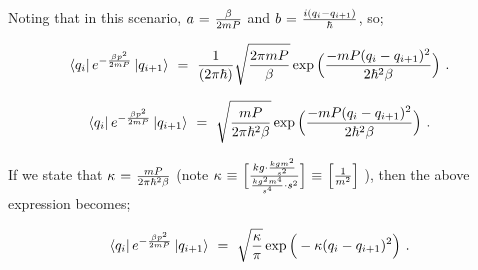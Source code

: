 \documentclass{article}
\begin{document}
Noting that in this scenario, \begin{math} a \hspace{0.025cm} = \hspace{0.025cm} \frac{\beta}{2 m P} \end{math} and \begin{math} b \hspace{0.025cm} = \hspace{0.025cm} \frac{i (q_i - q_{i + 1})}{\hbar} \end{math}, so;

\begin{equation} \label{eq:1}
\bra{q_i} e^{ - \frac{ \beta p^2}{2 m P}} \ket{q_{i+1}} \hspace{0.125cm} = \hspace{0.125cm} \frac{1}{(2 \pi \hbar)} \sqrt{\frac{2 \pi m P}{\beta}} \exp{\Big( \frac{ - m P (q_i - q_{i+1})^2}{2 \hbar^2 \beta}\Big)}  \hspace{0.125cm} .
\end{equation}

\begin{equation} \label{eq:1}
\bra{q_i} e^{ - \frac{ \beta p^2}{2 m P}} \ket{q_{i+1}} \hspace{0.125cm} = \hspace{0.125cm} \sqrt{\frac{m P}{2 \pi \hbar^2 \beta}} \exp{\Big( \frac{ - m P (q_i - q_{i+1})^2}{2 \hbar^2 \beta}\Big)} \hspace{0.125cm} .
\end{equation}

If we state that \begin{math} \kappa \hspace{0.025cm} = \hspace{0.025cm} \frac{m P}{2 \pi \hbar^2 \beta} \end{math} (note \begin{math} \kappa \hspace{0.025cm} \equiv \hspace{0.025cm} \Big[ \frac{kg \cdot \frac{kg m^2}{s^2}}{\frac{kg^2 m^4}{s^4} \cdot s^2}  \Big] \hspace{0.025cm} \equiv \hspace{0.025cm} \Big[ \frac{1}{m^2} \Big]  \end{math} ), then the above expression becomes;

\begin{equation} \label{eq:1}
\bra{q_i} e^{ - \frac{ \beta p^2}{2 m P}} \ket{q_{i+1}} \hspace{0.125cm} = \hspace{0.125cm} \sqrt{\frac{\kappa}{\pi}} \exp{\Big( - \kappa (q_i - q_{i+1})^2 \Big)} \hspace{0.125cm} .
\end{equation}
\end{document}
